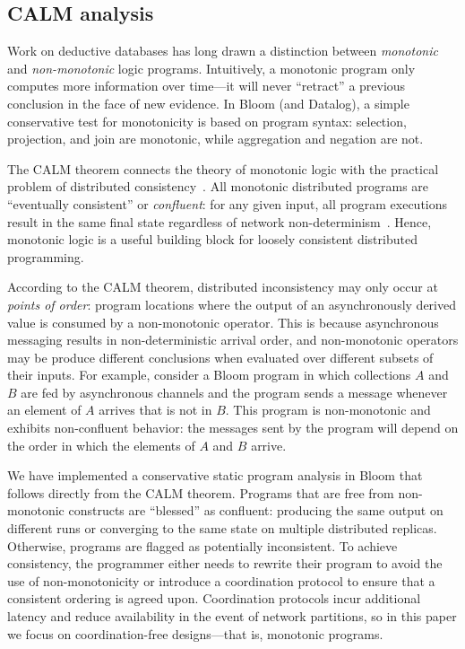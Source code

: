 \subsection{CALM analysis}
\label{sec:bg-calm}

Work on deductive databases has long drawn a distinction between
\emph{monotonic} and \emph{non-monotonic} logic programs. Intuitively, a
monotonic program only computes more information over time---it will never
``retract'' a previous conclusion in the face of new evidence.  In Bloom (and
Datalog), a simple conservative test for monotonicity is based on program
syntax: selection, projection, and join are monotonic, while aggregation and
negation are not.

The CALM theorem connects the theory of monotonic logic with the practical
problem of distributed consistency~\cite{Alvaro2011,Hellerstein2010}.  All
monotonic distributed programs are ``eventually consistent'' or
\emph{confluent}: for any given input, all program executions result in the same
final state regardless of network
non-determinism~\cite{Ameloot2011,dedalus-pods12-tr}.  Hence, monotonic logic is
a useful building block for loosely consistent distributed programming.

According to the CALM theorem, distributed inconsistency may only occur at
\emph{points of order}: program locations where the output of an asynchronously
derived value is consumed by a non-monotonic operator.  This is because
asynchronous messaging results in non-deterministic arrival order, and
non-monotonic operators may be produce different conclusions when evaluated over
different subsets of their inputs.  For example, consider a Bloom program in
which collections $A$ and $B$ are fed by asynchronous channels and the program
sends a message whenever an element of $A$ arrives that is not in $B$. This
program is non-monotonic and exhibits non-confluent behavior: the messages sent
by the program will depend on the order in which the elements of $A$ and $B$
arrive.

We have implemented a conservative static program analysis in Bloom that follows
directly from the CALM theorem.  Programs that are free from non-monotonic
constructs are ``blessed'' as confluent: producing the same output on different
runs or converging to the same state on multiple distributed replicas.
Otherwise, programs are flagged as potentially inconsistent.  To achieve
consistency, the programmer either needs to rewrite their program to avoid the
use of non-monotonicity or introduce a coordination protocol to ensure that a
consistent ordering is agreed upon. Coordination protocols incur additional
latency and reduce availability in the event of network partitions, so in this
paper we focus on coordination-free designs---that is, monotonic programs.

